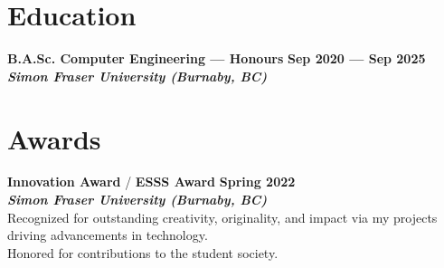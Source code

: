 \documentclass[letterpaper,11pt]{article}
\newcommand{\school} [5] {
    {\textbf{#3} \hfill \textbf{#4 --- #5}\\ \textbf{\emph{#1 #2}}\\}
}
\begin{document}
    \section{Education}
    \school{Simon Fraser University}{(Burnaby, BC)}{B.A.Sc. Computer Engineering --- Honours}{Sep 2020}{Sep 2025}

    \section{Awards}
    \textbf{Innovation Award} / \textbf{ESSS Award} \hfill \textbf{Spring 2022}\\
    \textbf{\emph{Simon Fraser University (Burnaby, BC)}}\\
    Recognized for outstanding creativity, originality, and impact via my projects driving advancements in technology.\\
    Honored for contributions to the student society.\\
\end{document}
